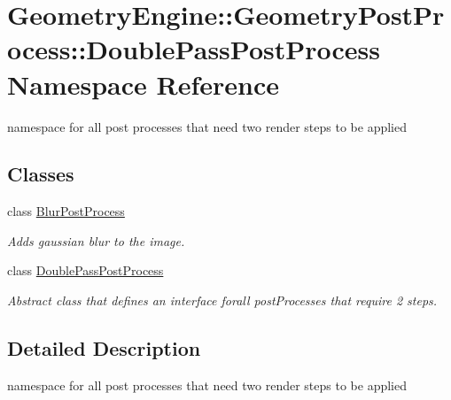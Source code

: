 \hypertarget{namespace_geometry_engine_1_1_geometry_post_process_1_1_double_pass_post_process}{}\section{Geometry\+Engine\+::Geometry\+Post\+Process\+::Double\+Pass\+Post\+Process Namespace Reference}
\label{namespace_geometry_engine_1_1_geometry_post_process_1_1_double_pass_post_process}


namespace for all post processes that need two render steps to be applied  


\subsection*{Classes}
\begin{DoxyCompactItemize}
\item 
class \mbox{\hyperlink{class_geometry_engine_1_1_geometry_post_process_1_1_double_pass_post_process_1_1_blur_post_process}{Blur\+Post\+Process}}
\begin{DoxyCompactList}\small\item\em Adds gaussian blur to the image. \end{DoxyCompactList}\item 
class \mbox{\hyperlink{class_geometry_engine_1_1_geometry_post_process_1_1_double_pass_post_process_1_1_double_pass_post_process}{Double\+Pass\+Post\+Process}}
\begin{DoxyCompactList}\small\item\em Abstract class that defines an interface forall post\+Processes that require 2 steps. \end{DoxyCompactList}\end{DoxyCompactItemize}


\subsection{Detailed Description}
namespace for all post processes that need two render steps to be applied 